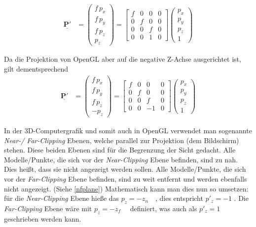 \begin{align}\mathbf{\underline{P'}} & =
	\begin{pmatrix}f \, p_x \\f \, p_y \\ f \, p_z\\ p_z\end{pmatrix}  = \begin{bmatrix} f & 0 & 0 & 0 \\ 0 & f & 0 & 0 \\ 0 & 0 & f & 0 \\ 0 & 0 & 1 & 0 \end{bmatrix} \begin{pmatrix}p_x \\p_y
		\\ p_z\\ 1 \end{pmatrix} \end{align}

Da die Projektion von OpenGL aber auf die negative Z-Achse ausgerichtet ist, gilt dementsprechend
\begin{align}\mathbf{\underline{P'}} & =
	\begin{pmatrix}f \, p_x \\f \, p_y \\ f \, p_z\\ -p_z\end{pmatrix}  = \begin{bmatrix} f & 0 & 0 & 0 \\ 0 & f & 0 & 0 \\ 0 & 0 & f & 0 \\ 0 & 0 & -1 & 0 \end{bmatrix} \begin{pmatrix}p_x \\p_y
		\\ p_z\\ 1\end{pmatrix} \end{align}

In der 3D-Computergrafik und somit auch in OpenGL verwendet man sogenannte \textit{Near-/ Far-Clipping} Ebenen, welche parallel zur Projektion (dem Bildschirm) stehen. Diese beiden Ebenen sind für die Begrenzung der Sicht gedacht. Alle Modelle/Punkte, die sich vor der \textit{Near-Clipping} Ebene befinden, sind zu nah. Dies heißt, dass sie nicht angezeigt werden sollen. Alle Modelle/Punkte, die sich vor der \textit{Far-Clipping} Ebene befinden, sind zu weit entfernt und werden ebenfalls nicht angezeigt. (Siehe \cref{nfplane}) Mathematisch kann man dies nun so umsetzen: für die \textit{Near-Clipping} Ebene hieße das $p_z=-z_n \quad$, dies entspricht $p'_z=-1$ . Die \textit{Far-Clipping} Ebene wäre mit $p_z=-z_f \quad$ definiert, was auch als $p'_z=1$ geschrieben werden kann.


